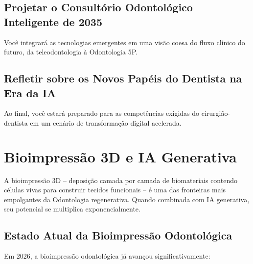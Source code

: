 \subsection{Projetar o Consultório Odontológico Inteligente de 2035}
Você integrará as tecnologias emergentes em uma visão coesa do fluxo clínico do futuro, da teleodontologia à Odontologia 5P.

\subsection{Refletir sobre os Novos Papéis do Dentista na Era da IA}
Ao final, você estará preparado para as competências exigidas do cirurgião-dentista em um cenário de transformação digital acelerada.

\section{Bioimpressão 3D e IA Generativa}
\label{sec:bioimpressao}

\nivelcinco

A bioimpressão 3D -- deposição camada por camada de biomateriais contendo
células vivas para construir tecidos funcionais -- é uma das fronteiras mais
empolgantes da Odontologia regenerativa. Quando combinada com IA generativa, seu
potencial se multiplica exponencialmente.


\subsection{Estado Atual da Bioimpressão Odontológica}

Em 2026, a bioimpressão odontológica já avançou significativamente:


